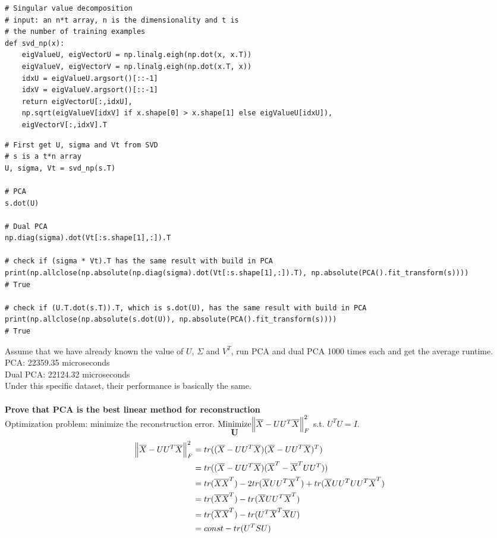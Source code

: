 \documentclass[12pt]{article}
\begin{document}
\begin{spacing}{1.0}
\begin{lstlisting}
# Singular value decomposition
# input: an n*t array, n is the dimensionality and t is 
# the number of training examples
def svd_np(x):
    eigValueU, eigVectorU = np.linalg.eigh(np.dot(x, x.T))
    eigValueV, eigVectorV = np.linalg.eigh(np.dot(x.T, x))
    idxU = eigValueU.argsort()[::-1]
    idxV = eigValueV.argsort()[::-1]
    return eigVectorU[:,idxU], 
    np.sqrt(eigValueV[idxV] if x.shape[0] > x.shape[1] else eigValueU[idxU]), 
    eigVectorV[:,idxV].T
\end{lstlisting}
\begin{lstlisting}
# First get U, sigma and Vt from SVD
# s is a t*n array
U, sigma, Vt = svd_np(s.T)

# PCA
s.dot(U)

# Dual PCA
np.diag(sigma).dot(Vt[:s.shape[1],:]).T

# check if (sigma * Vt).T has the same result with build in PCA
print(np.allclose(np.absolute(np.diag(sigma).dot(Vt[:s.shape[1],:]).T), np.absolute(PCA().fit_transform(s))))
# True

# check if (U.T.dot(s.T)).T, which is s.dot(U), has the same result with build in PCA
print(np.allclose(np.absolute(s.dot(U)), np.absolute(PCA().fit_transform(s))))
# True
\end{lstlisting}
\end{spacing}
\noindent
Assume that we have already known the value of $U$, $\Sigma$ and $V^T$, run PCA and dual PCA 1000 times each and get the average runtime.\\
PCA: 22359.35 microseconds\\
Dual PCA: 22124.32 microseconds\\
Under this specific dataset, their performance is basically the same.\\\\
\textbf{Prove that PCA is the best linear method for reconstruction}\\
Optimization problem: minimize the reconstruction error. $\stackunder{Minimize}{\textbf{U}}\norm{\overline{X}-UU^T\overline{X}}_F^2$ s.t. $U^TU=I$.
\begin{equation}
\begin{split}
\norm{\overline{X}-UU^T\overline{X}}_F^2 & = tr((\overline{X}-UU^T\overline{X})(\overline{X}-UU^T\overline{X})^T)\\
& = tr((\overline{X}-UU^T\overline{X})(\overline{X}^T-\overline{X}^TUU^T))\\
& = tr(\overline{X}\overline{X}^T) - 2tr(\overline{X}UU^T\overline{X}^T) + tr(\overline{X}UU^TUU^T\overline{X}^T)\\
& = tr(\overline{X}\overline{X}^T) - tr(\overline{X}UU^T\overline{X}^T)\\
& = tr(\overline{X}\overline{X}^T) - tr(U^T\overline{X}^T\overline{X}U)\\
& = const - tr(U^TSU)
\end{split}
\end{equation}
\end{document}
